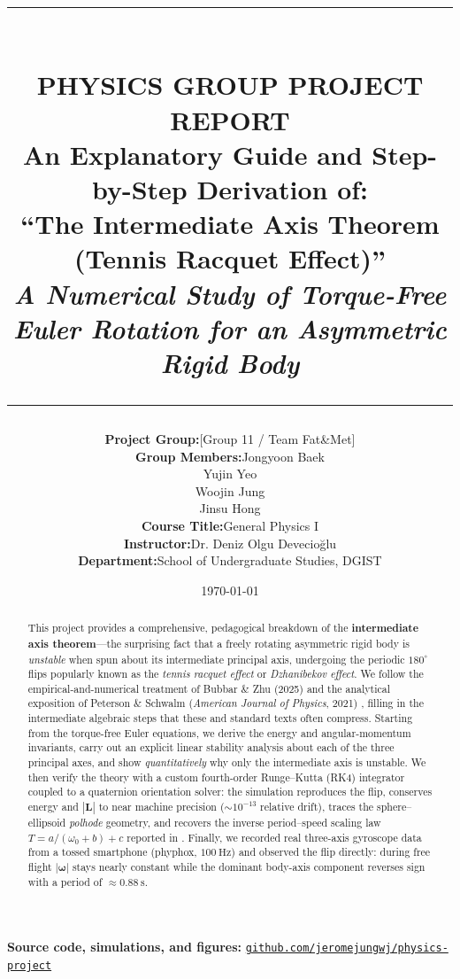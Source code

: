 \documentclass[11pt,letterpaper]{article}
\title{
\vspace{-1.5in}
\rule{\linewidth}{1.5pt} \\ \vspace{4mm}
\large\textbf{PHYSICS GROUP PROJECT REPORT} \\ \vspace{2mm}
\Large\textbf{An Explanatory Guide and Step-by-Step
Derivation of: \\ ``The Intermediate Axis Theorem
(Tennis Racquet Effect)''}
\\ \vspace{4mm}
\large\textit{A Numerical Study of Torque-Free Euler Rotation for an
Asymmetric Rigid Body} \\
\rule{\linewidth}{1.5pt}
}
\author{
\begin{tabular}{r @{\quad} l}
\textbf{Project Group:} & [Group 11 / Team Fat\&Met] \\[1ex]
\textbf{Group Members:} & Jongyoon Baek \\
& Yujin Yeo \\
& Woojin Jung \\
& Jinsu Hong \\[1ex]
\textbf{Course Title:}  & General Physics I \\
\textbf{Instructor:}    & Dr. Deniz Olgu Devecioğlu \\
\textbf{Department:}    & School of Undergraduate Studies, DGIST
\end{tabular}
}
\date{\today}
\begin{document}
\maketitle
\begin{abstract}
This project provides a comprehensive, pedagogical breakdown of the
\textbf{intermediate axis theorem}---the surprising fact that a freely
rotating asymmetric rigid body is \emph{unstable} when spun about its
intermediate principal axis, undergoing the periodic $180^\circ$ flips
popularly known as the \emph{tennis racquet effect} or \emph{Dzhanibekov
effect}. We follow the empirical-and-numerical treatment of Bubbar \& Zhu
(2025) \cite{bubbar2025} and the analytical exposition of Peterson \& Schwalm
(\textit{American Journal of Physics}, 2021) \cite{peterson2021}, filling in
the intermediate algebraic steps that these and standard texts often compress.
Starting from the torque-free Euler equations, we derive the energy and
angular-momentum invariants, carry out an explicit linear stability analysis
about each of the three principal axes, and show \emph{quantitatively} why only
the intermediate axis is unstable. We then verify the theory with a custom
fourth-order Runge--Kutta (RK4) integrator coupled to a quaternion orientation
solver: the simulation reproduces the flip, conserves energy and $|\mathbf{L}|$
to near machine precision ($\sim 10^{-13}$ relative drift), traces the
sphere--ellipsoid \emph{polhode} geometry, and recovers the inverse
period--speed scaling law $T = a/(\omega_0+b)+c$ reported in
\cite{bubbar2025}. Finally, we recorded real three-axis gyroscope data from a
tossed smartphone (phyphox, $100~\mathrm{Hz}$) and observed the flip directly:
during free flight $|\boldsymbol{\omega}|$ stays nearly constant while the
dominant body-axis component reverses sign with a period of
$\approx 0.88~\mathrm{s}$.
\end{abstract}

\begin{center}
\small\textbf{Source code, simulations, and figures:}
\href{https://github.com/jeromejungwj/physics-project}{\texttt{github.com/jeromejungwj/physics-project}}
\end{center}

\tableofcontents
\newpage
\end{document}

